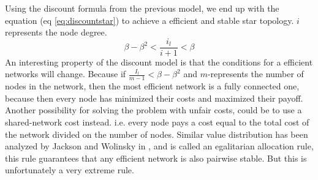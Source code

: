 Using the discount formula from the previous model, we end up with the equation (eq \ref{eq:discountstar}) to achieve a efficient and stable star topology. $i$ represents the node degree.
\begin{equation}
\beta-\beta^2<\frac{i_{l}}{i+1}< \beta
\label{eq:discountstar}
\end{equation}
An interesting property of the discount model is that the conditions for a efficient networks will change. Because
if $\frac{I_{l}}{m-1}<\beta-\beta^2$ and $m$-represents the number of nodes in the network, then the most efficient network is a fully connected one, because then every node has minimized their costs and maximized their payoff.
Another possibility for solving the problem with unfair costs, could be to use a shared-network cost instead. i.e. every node pays a cost equal to the total cost of the network divided on the number of nodes. 
Similar value distribution has been analyzed by Jackson and Wolinsky in \cite{jackson1996strategic}, and is called an egalitarian allocation rule, this rule guarantees that any efficient network is also pairwise stable. But this is unfortunately a very extreme rule.






